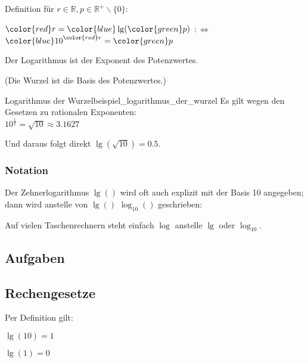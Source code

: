 Definition für $r\in\mathbb{R}, p \in \mathbb{R}^{+}\backslash\{0\}$:
\begin{definition}{}{}
  \begin{center}
    ${\color{red}r} = {\color{blue}\lg}({\color{green}p})$
    $:\Leftrightarrow$
    ${\color{blue}10}^{\color{red}r}={\color{green}p}$
    \end{center}
\end{definition}

Der Logarithmus ist der Exponent des Potenzwertes.

(Die Wurzel ist die Basis des Potenzwertes.)

\begin{beispiel}{Logarithmus der
    Wurzel}{beispiel_logarithmus_der_wurzel}
  Es gilt wegen den Gesetzen zu rationalen Exponenten:\\
$10^{\frac12} = \sqrt{10} \approx 3.1627$

  Und daraus folgt direkt $\lg(\sqrt{10}) = 0.5$.
\end{beispiel}

\subsubsection{Notation}
Der Zehnerlogarithmus $\lg()$ wird oft auch explizit mit der Basis 10
angegeben; dann wird anstelle von $\lg()$ $\log_{10}()$ geschrieben:

\begin{center}
\end{center}

Auf vielen Taschenrechnern steht einfach $\log$ anstelle $\lg$ oder $\log_{10}$.
\newpage


\subsection*{Aufgaben}

\newpage


\subsection{Rechengesetze}
Per Definition gilt:

\begin{gesetz}{}{}
$\lg(10) = 1$
\end{gesetz}

\begin{gesetz}{}{}
$\lg(1) = 0$
\end{gesetz}

